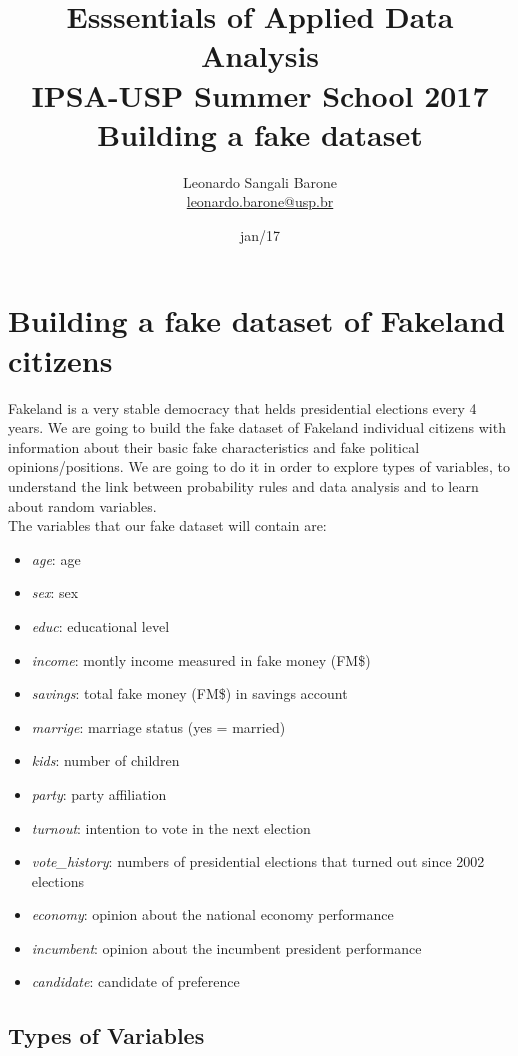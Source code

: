\documentclass[11pt]{article}
\title{\textbf{Esssentials of Applied Data Analysis\\
				IPSA-USP Summer School 2017}\newline\\
				Building a fake dataset}
\author{Leonardo Sangali Barone\\ \href{leonardo.barone@usp.br}{leonardo.barone@usp.br}}
\date{jan/17}
\begin{document}
\maketitle

\section*{Building a fake dataset of Fakeland citizens}

	Fakeland is a very stable democracy that helds presidential elections every 4 years. We are going to build the fake dataset of Fakeland individual citizens with information about their basic fake characteristics and fake political opinions/positions. We are going to do it in order to explore types of variables, to understand the link between probability rules and data analysis and to learn about random variables.\\
	
	The variables that our fake dataset will contain are:
	
	\begin{itemize}

	\item \emph{age}: age
	\item \emph{sex}: sex
	\item \emph{educ}: educational level
	\item \emph{income}: montly income measured in fake money (FM\$)
	\item \emph{savings}: total fake money (FM\$) in savings account
	\item \emph{marrige}: marriage status (yes = married)
	\item \emph{kids}: number of children
	\item \emph{party}: party affiliation
	\item \emph{turnout}: intention to vote in the next election
	\item \emph{vote\_history}: numbers of presidential elections that turned out since 2002 elections
	\item \emph{economy}: opinion about the national economy performance
	\item \emph{incumbent}: opinion about the incumbent president performance
	\item \emph{candidate}: candidate of preference
	
	\end{itemize}
	
	\subsection*{Types of Variables}
\end{document}
